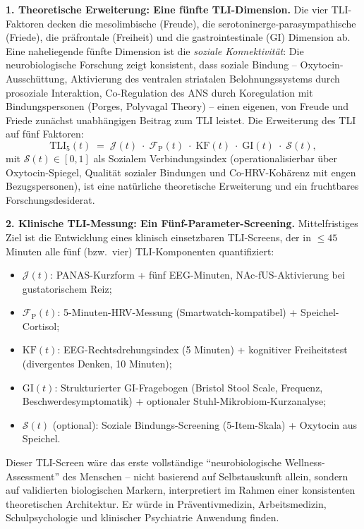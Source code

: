 ﻿\documentclass[12pt,a4paper]{report}
\theoremstyle{plain}
\theoremstyle{definition}
\theoremstyle{remark}
\begin{document}
	\textbf{1. Theoretische Erweiterung: Eine fünfte TLI-Dimension.}
	Die vier TLI-Faktoren decken die mesolimbische (Freude),
	die serotoninerge-parasympathische (Friede), die prä\-frontale (Freiheit)
	und die gastrointestinale (GI) Dimension ab.
	Eine naheliegende fünfte Dimension ist die \emph{soziale Konnektivität}:
	Die neurobiologische Forschung zeigt konsistent, dass soziale Bindung
	-- Oxytocin-Ausschüttung, Aktivierung des ventralen striatalen
	Belohnungssystems durch prosoziale Interaktion, Co-Regulation
	des ANS durch Koregulation mit Bindungspersonen (Porges, Polyvagal
	Theory) -- einen eigenen, von Freude und Friede zunächst unabhängigen
	Beitrag zum TLI leistet.
	Die Erweiterung des TLI auf fünf Faktoren:
	\[
	\mathrm{TLI}_5(t)
	\;=\;
	\mathcal{J}(t)\;\cdot\;\mathcal{F}_{\mathrm{P}}(t)
	\;\cdot\;\mathrm{KF}(t)\;\cdot\;\mathrm{GI}(t)
	\;\cdot\;\mathcal{S}(t),
	\]
	mit $\mathcal{S}(t) \in [0,1]$ als Sozialem Verbindungsindex
	(operationalisierbar über Oxytocin-Spiegel, Qualität sozialer
	Bindungen und Co-HRV-Kohärenz mit engen Bezugspersonen),
	ist eine natürliche theoretische Erweiterung und ein fruchtbares
	Forschungsdesiderat.

	\textbf{2. Klinische TLI-Messung: Ein Fünf-Parameter-Screening.}
	Mittelfristiges Ziel ist die Entwicklung eines klinisch
	einsetzbaren TLI-Screens, der in $\leq 45$ Minuten alle
	fünf (bzw.\ vier) TLI-Komponenten quantifiziert:
	\begin{itemize}
		\item $\mathcal{J}(t)$: PANAS-Kurzform + fünf EEG-Minuten,
		NAc-fUS-Aktivierung bei gustatorischem Reiz;
		\item $\mathcal{F}_{\mathrm{P}}(t)$: 5-Minuten-HRV-Messung
		(Smartwatch-kompatibel) + Speichel-Cortisol;
		\item $\mathrm{KF}(t)$: EEG-Rechtsdrehungsindex (5 Minuten)
		+ kognitiver Freiheitstest (divergentes Denken, 10 Minuten);
		\item $\mathrm{GI}(t)$: Strukturierter GI-Fragebogen
		(Bristol Stool Scale, Frequenz, Beschwerdesymptomatik) +
		optionaler Stuhl-Mikrobiom-Kurzanalyse;
		\item $\mathcal{S}(t)$ (optional): Soziale Bindungs-Screening
		(5-Item-Skala) + Oxytocin aus Speichel.
	\end{itemize}
	Dieser TLI-Screen wäre das erste vollständige
	``neurobiologische Wellness-Assessment'' des Menschen --
	nicht basierend auf Selbstauskunft allein, sondern auf
	validierten biologischen Markern, interpretiert im Rahmen
	einer konsistenten theoretischen Architektur.
	Er würde in Präventivmedizin, Arbeitsmedizin, Schulpsychologie
	und klinischer Psychiatrie Anwendung finden.
\end{document}
